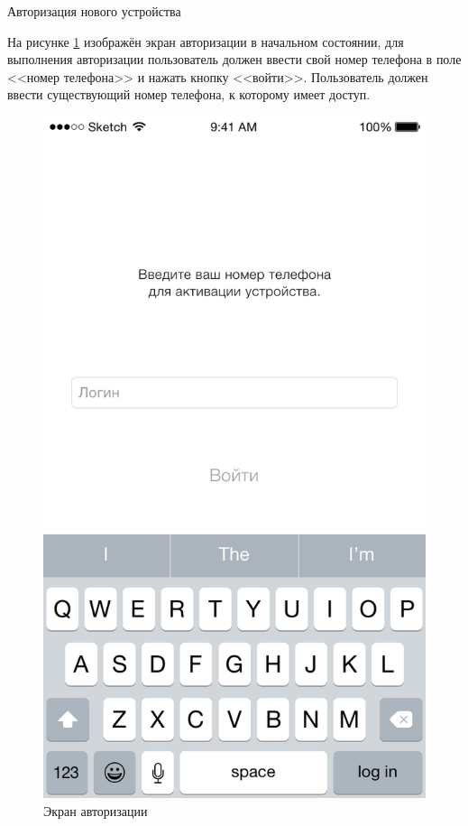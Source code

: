 \subsubsection{} Авторизация нового устройства
\label{sec:usage:auth:auth}

На рисунке \ref{sec:usage:auth:auth:login-empty} изображён экран авторизации в начальном состоянии, для выполнения авторизации пользователь должен ввести свой номер телефона в поле <<номер телефона>> и нажать кнопку <<войти>>. Пользователь должен ввести существующий номер телефона, к которому имеет доступ.

\begin{figure}[h]
  \centering
    \includegraphics[height=0.25\textheight]{inc/img/ui/login_not_entered.png}
  \caption{Экран авторизации}
  \label{sec:usage:auth:auth:login-empty}
\end{figure}